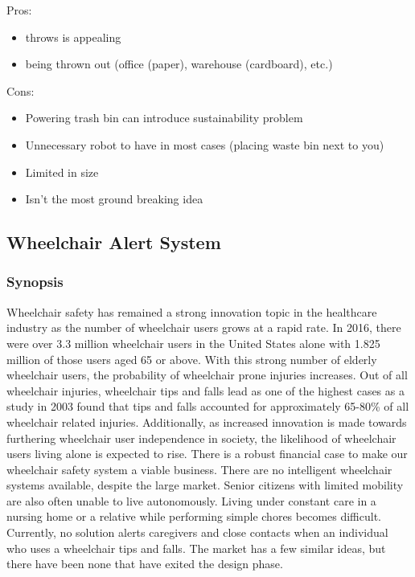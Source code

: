 \documentclass[11pt]{article}
\begin{document}
Pros:
\begin{itemize}
\item throws is appealing
\item being thrown out (office (paper), warehouse (cardboard), etc.)
\end{itemize}

Cons:
\begin{itemize}
\item Powering trash bin can introduce sustainability problem
\item Unnecessary robot to have in most cases (placing waste bin next to you)
\item Limited in size
\item Isn’t the most ground breaking idea
\end{itemize}









\subsection{Wheelchair Alert System}
\label{sec:org59ec370}

\subsubsection{Synopsis}
\label{sec:orge007168}
Wheelchair safety has remained a strong innovation topic in the healthcare industry as the number of wheelchair users grows at a rapid rate. In 2016, there were over 3.3 million wheelchair users in the United States alone with 1.825 million of those users aged 65 or above. With this strong number of elderly wheelchair users, the probability of wheelchair prone injuries increases. Out of all wheelchair injuries, wheelchair tips and falls lead as one of the highest cases as a study in 2003 found that tips and falls accounted for approximately 65-80\% of all wheelchair related injuries. Additionally, as increased innovation is made towards furthering wheelchair user independence in society, the likelihood of wheelchair users living alone is expected to rise. There is a robust financial case to make our wheelchair safety system a viable business. There are no intelligent wheelchair systems available, despite the large market. Senior citizens with limited mobility are also often unable to live autonomously. Living under constant care in a nursing home or a relative while performing simple chores becomes difficult. Currently, no solution alerts caregivers and close contacts when an individual who uses a wheelchair tips and falls. The market has a few similar ideas, but there have been none that have exited the design phase.
\end{document}
